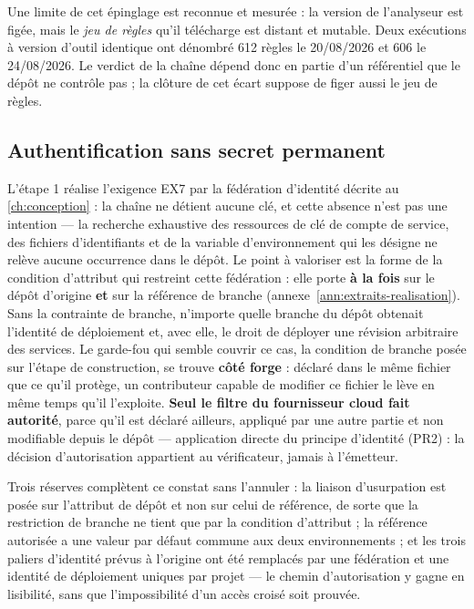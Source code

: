\begin{alertbox}[boxsep=1pt, left=4pt, right=4pt, top=3pt, bottom=3pt]
Une limite de cet épinglage est reconnue et mesurée : la version de l'analyseur est figée, mais le
\emph{jeu de règles} qu'il télécharge est distant et mutable. Deux exécutions à version d'outil
identique ont dénombré 612 règles le 20/08/2026 et 606 le 24/08/2026. Le verdict de la chaîne
dépend donc en partie d'un référentiel que le dépôt ne contrôle pas ; la clôture de cet écart
suppose de figer aussi le jeu de règles.
\end{alertbox}

\subsection{Authentification sans secret permanent}
\label{subsec:wif}

L'étape 1 réalise l'exigence EX7 par la fédération d'identité décrite au \cref{ch:conception} : la chaîne ne
détient aucune clé, et cette absence n'est pas une intention --- la recherche exhaustive des
ressources de clé de compte de service, des fichiers d'identifiants et de la variable
d'environnement qui les désigne ne relève aucune occurrence dans le dépôt. Le point à valoriser est
la forme de la condition d'attribut qui restreint cette fédération : elle porte \textbf{à la fois}
sur le dépôt d'origine \textbf{et} sur la référence de branche
(annexe~\ref{ann:extraits-realisation}). Sans la contrainte de branche, n'importe quelle branche du
dépôt obtenait l'identité de déploiement et, avec elle, le droit de déployer une révision arbitraire
des services. Le garde-fou qui semble couvrir ce cas, la condition de branche posée sur l'étape de
construction, se trouve \textbf{côté forge} : déclaré dans le même fichier que ce qu'il protège, un
contributeur capable de modifier ce fichier le lève en même temps qu'il l'exploite. \textbf{Seul le
filtre du fournisseur cloud fait autorité}, parce qu'il est déclaré ailleurs, appliqué par une autre
partie et non modifiable depuis le dépôt --- application directe du principe d'identité (PR2) : la
décision d'autorisation appartient au vérificateur, jamais à l'émetteur.

Trois réserves complètent ce constat sans l'annuler : la liaison d'usurpation est posée sur
l'attribut de dépôt et non sur celui de référence, de sorte que la restriction de branche ne tient
que par la condition d'attribut ; la référence autorisée a une valeur par défaut commune aux deux
environnements ; et les trois paliers d'identité prévus à l'origine ont été remplacés par une
fédération et une identité de déploiement uniques par projet --- le chemin d'autorisation y gagne en
lisibilité, sans que l'impossibilité d'un accès croisé soit prouvée.

